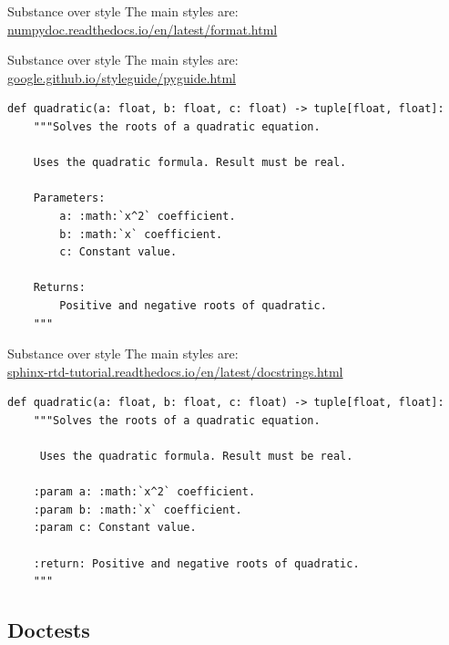 \documentclass[usenames,dvipsnames]{beamer}
\newcommand{\kw}[1]{\texttt{\detokenize{#1}}}
\begin{document}
\begin{frame}[fragile]{Substance over style}
    The main styles are: 
    \kw{numpydoc} \\
    {\footnotesize \url{numpydoc.readthedocs.io/en/latest/format.html}}

    

\end{frame}
    
\begin{frame}[fragile]{Substance over style}
    The main styles are: 
    \kw{google} \\ 
    {\footnotesize \url{google.github.io/styleguide/pyguide.html}}

    \begin{lstlisting}[basicstyle=\scriptsize]
def quadratic(a: float, b: float, c: float) -> tuple[float, float]:
    """Solves the roots of a quadratic equation.

    Uses the quadratic formula. Result must be real.

    Parameters:
        a: :math:`x^2` coefficient.
        b: :math:`x` coefficient.
        c: Constant value.
    
    Returns:
        Positive and negative roots of quadratic.
    """
    \end{lstlisting}

\end{frame}

\begin{frame}[fragile]{Substance over style}
    The main styles are: 
    \kw{sphinx} \\ 
    {\footnotesize \url{sphinx-rtd-tutorial.readthedocs.io/en/latest/docstrings.html}}

    \begin{lstlisting}[basicstyle=\scriptsize]
def quadratic(a: float, b: float, c: float) -> tuple[float, float]:
    """Solves the roots of a quadratic equation.

     Uses the quadratic formula. Result must be real.
     
    :param a: :math:`x^2` coefficient.
    :param b: :math:`x` coefficient.
    :param c: Constant value.
    
    :return: Positive and negative roots of quadratic.
    """
    \end{lstlisting}

\end{frame}

\subsection{Doctests}
\end{document}

